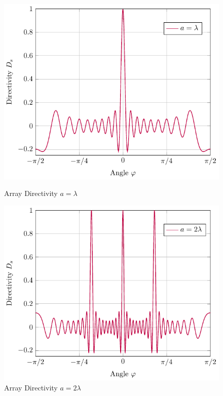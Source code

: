 \begin{figure}
    \begin{minipage}{0.49\textwidth}
    \centering
    \includegraphics[width=\textwidth]{images/3_Parametric_array/Directivity_NoSteer_Lambda.pdf}
    \caption{Array Directivity $a = \lambda$}
    \label{3_subfig:directivity_no_steer_lambda1}
    \end{minipage}
    \begin{minipage}{0.49\textwidth}
    \centering
    \includegraphics[width=\textwidth]{images/3_Parametric_array/Directivity_NoSteer_2Lambda.pdf}
    \caption{Array Directivity $a = 2\lambda$}
     \label{3_subfig:directivity_no_steer_2lambda}
    \end{minipage}
\end{figure}

